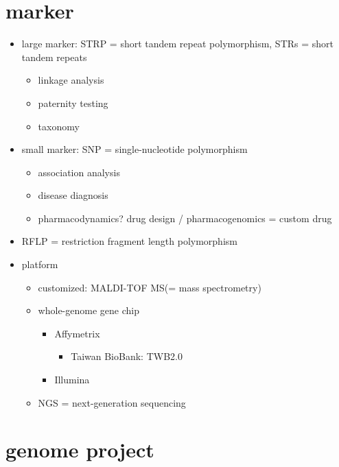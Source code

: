 \documentclass[
]{book}
\providecommand{\tightlist}{%
  \setlength{\itemsep}{0pt}\setlength{\parskip}{0pt}}
\theoremstyle{definition}
\theoremstyle{definition}
\theoremstyle{definition}
\theoremstyle{definition}
\theoremstyle{remark}
\begin{document}
\section{marker}\label{marker}

\begin{itemize}
\tightlist
\item
  large marker: STRP = short tandem repeat polymorphism, STRs = short tandem repeats

  \begin{itemize}
  \tightlist
  \item
    linkage analysis
  \item
    paternity testing
  \item
    taxonomy
  \end{itemize}
\item
  small marker: SNP = single-nucleotide polymorphism

  \begin{itemize}
  \tightlist
  \item
    association analysis
  \item
    disease diagnosis
  \item
    pharmacodynamics? drug design / pharmacogenomics = custom drug
  \end{itemize}
\item
  RFLP = restriction fragment length polymorphism
\item
  platform

  \begin{itemize}
  \tightlist
  \item
    customized: MALDI-TOF MS(= mass spectrometry)
  \item
    whole-genome gene chip

    \begin{itemize}
    \tightlist
    \item
      Affymetrix

      \begin{itemize}
      \tightlist
      \item
        Taiwan BioBank: TWB2.0
      \end{itemize}
    \item
      Illumina
    \end{itemize}
  \item
    NGS = next-generation sequencing
  \end{itemize}
\end{itemize}

\section{genome project}\label{genome-project}
\end{document}
